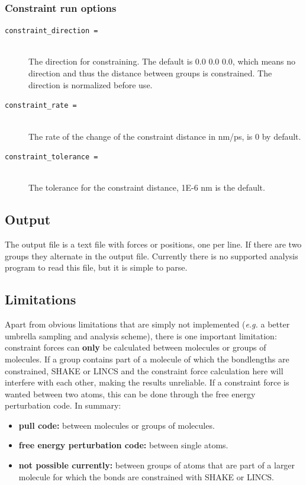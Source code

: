 \subsubsection{Constraint run options}

\begin{description}
\item[\tt constraint\_direction     = ]\mbox{}\\
The direction for constraining.
The default is 0.0 0.0 0.0, which means no direction and
thus the distance between groups is constrained.
The direction is normalized before use.

\item[\tt constraint\_rate          = ]\mbox{}\\
The rate of the change of the constraint distance in nm/ps,
is 0 by default.

\item[\tt constraint\_tolerance     = ]\mbox{}\\
The tolerance for the constraint distance, 1E-6 nm is the default.

\end{description}

\subsection{Output}
The output file is a text file with forces or positions, one per
line. If there are two groups they alternate in the output
file. Currently there is no supported analysis program to read this
file, but it is simple to parse.

\subsection{Limitations}
Apart from obvious limitations that are simply not implemented (\emph{e.g.} a
better umbrella sampling and analysis scheme), there is one important
limitation: constraint forces can \textbf{only} be calculated between
molecules or groups of molecules. If a group contains part of a
molecule of which the bondlengths are constrained, SHAKE or LINCS and
the constraint force calculation here will interfere with each other,
making the results unreliable. If a constraint force is wanted between
two atoms, this can be done through the free energy perturbation
code. In summary: 

\begin{itemize}
\item{\bf pull code:} between molecules or groups of molecules.
\item{\bf free energy perturbation code:} between single atoms. 
\item{\bf not possible currently:} between groups of atoms that are
part of a larger molecule for which the bonds are constrained with
SHAKE or LINCS.
\end{itemize}

